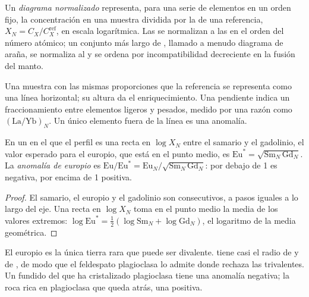 \begin{definition}\label{def:b2:elements-in-the-earth:normalised}
Un \emph{diagrama normalizado} representa, para una serie de
elementos en un orden fijo, la concentración en una muestra dividida por la de una
referencia, $X_N = C_X/C_X^{\mathrm{ref}}$, en escala logarítmica. Las 
se normalizan a las  en el orden del número atómico; un conjunto más largo de
, llamado a menudo diagrama de araña, se normaliza al
 y se ordena por incompatibilidad decreciente en la fusión del manto.
\end{definition}

Una muestra con las mismas proporciones que la referencia se representa como una línea horizontal;
su altura da el enriquecimiento. Una pendiente indica un fraccionamiento entre elementos
ligeros y pesados, medido por una razón como $(\mathrm{La}/\mathrm{Yb})_N$. Un
único elemento fuera de la línea es una anomalía.

\begin{proposition}\label{prop:b2:elements-in-the-earth:normalised}
En un  en el que el perfil es una recta en
$\log X_N$ entre el samario y el gadolinio, el valor esperado para el europio, que
está en el punto medio, es $\mathrm{Eu}^* = \sqrt{\mathrm{Sm}_N\,\mathrm{Gd}_N}$. La
\emph{anomalía de europio} es
$\mathrm{Eu}/\mathrm{Eu}^* = \mathrm{Eu}_N/\sqrt{\mathrm{Sm}_N\,\mathrm{Gd}_N}$:
por debajo de 1 es negativa, por encima de 1 positiva.
\end{proposition}

\begin{proof}
El samario, el europio y el gadolinio son consecutivos, a pasos iguales a lo largo del eje.
Una recta en $\log X_N$ toma en el punto medio la media de los valores extremos:
$\log \mathrm{Eu}^* = \tfrac12(\log \mathrm{Sm}_N + \log \mathrm{Gd}_N)$, el
logaritmo de la media geométrica.
\end{proof}

El europio es la única tierra rara que puede ser divalente.  tiene casi el
radio de  y de , de modo que el feldespato plagioclasa lo admite donde
rechaza las  trivalentes. Un fundido del que ha cristalizado plagioclasa
tiene una anomalía negativa; la roca rica en plagioclasa que queda atrás, una positiva.

